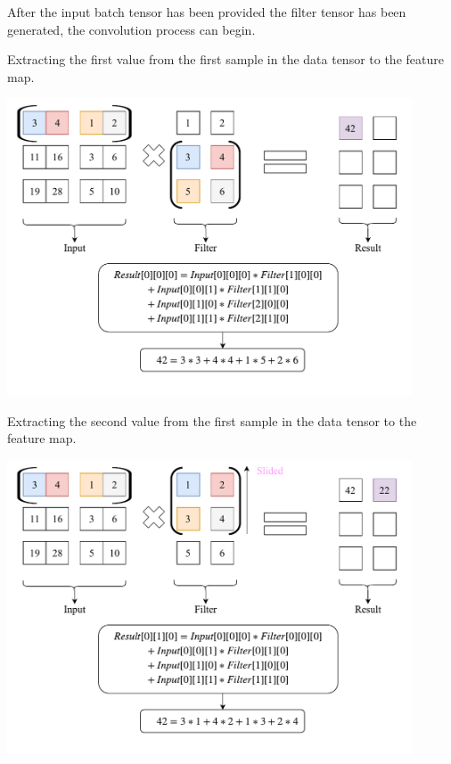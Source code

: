 \documentclass[a4paper, 12pt]{report}
\begin{document}
\newpage
After the input batch tensor has been provided the filter tensor has been generated, the convolution process can begin.\\
\begin{blockfigure}{ Extracting the first value from the first sample in the data tensor to the feature map.}
	\begin{center}
		\includegraphics[width=0.9\textwidth]{secondConvSample_step1}
	\end{center}
\end{blockfigure}
\begin{blockfigure}{Extracting the second value from the first sample in the data tensor to the feature map.}
	\begin{center}
		\includegraphics[width=0.9\textwidth]{secondConvSample_step2}
	\end{center}
\end{blockfigure}
\newpage
\end{document}
